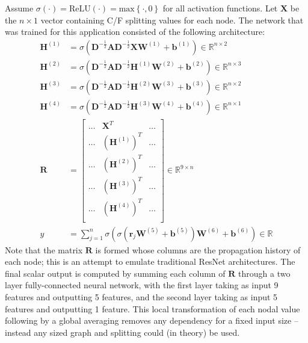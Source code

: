 \documentclass[review]{siamart190516}
\newcommand{\mat}[1]{\bm{{#1}}}
\renewcommand{\vec}[1]{\bm{{#1}}}
\begin{document}
Assume $\sigma\left(\cdot\right) = \text{ReLU}\left(\cdot\right) = \text{max}\left\{\cdot, 0\right\}$ for all activation functions.  Let $\mat{X}$ be the $n \times 1$ vector containing C/F splitting values for each node.  The network that was trained for this application consisted of the following architecture:
\begin{align*}
\mat{H}^{(1)} &= \sigma\left( \mat{D}^{-\frac{1}{2}} \mat{A} \mat{D}^{-\frac{1}{2}} \mat{X} \mat{W}^{(1)} + \vec{b}^{(1)} \right) \in \mathbb{R}^{n \times 2} \\
\mat{H}^{(2)} &= \sigma\left( \mat{D}^{-\frac{1}{2}} \mat{A} \mat{D}^{-\frac{1}{2}} \mat{H}^{(1)} \mat{W}^{(2)} + \vec{b}^{(2)}\right) \in \mathbb{R}^{n \times 3}\\
  \mat{H}^{(3)} &= \sigma\left( \mat{D}^{-\frac{1}{2}} \mat{A} \mat{D}^{-\frac{1}{2}} \mat{H}^{(2)} \mat{W}^{(3)} + \vec{b}^{(3)}\right) \in \mathbb{R}^{n \times 2}\\
  \mat{H}^{(4)} &= \sigma\left( \mat{D}^{-\frac{1}{2}} \mat{A} \mat{D}^{-\frac{1}{2}} \mat{H}^{(3)} \mat{W}^{(4)} + \vec{b}^{(4)}\right) \in \mathbb{R}^{n \times 1}\\
\mat{R} &=
\begin{bmatrix}
\hdots & \mat{X}^T & \hdots \\
\hdots & \left(\mat{H}^{(1)}\right)^T & \hdots \\
\hdots & \left(\mat{H}^{(2)}\right)^T & \hdots \\
\hdots & \left(\mat{H}^{(3)}\right)^T & \hdots \\
\hdots & \left(\mat{H}^{(4)}\right)^T & \hdots \\
\end{bmatrix} \in \mathbb{R}^{9 \times n}\\
y &= \sum_{j=1}^n \sigma\left( \sigma\left(\mat{r}_j\mat{W}^{(5)} + \vec{b}^{(5)}\right) \mat{W}^{(6)} + \vec{b}^{(6)}\right) \in \mathbb{R}
\end{align*}
Note that the matrix $\mat{R}$ is formed whose columns are the propagation history of each node; this is an attempt to emulate traditional ResNet architectures.  The final scalar output is computed by summing each column of $\mat{R}$ through a two layer fully-connected neural network, with the first layer taking as input 9 features and outputting 5 features, and the second layer taking as input 5 features and outputting 1 feature.  This local transformation of each nodal value following by a global averaging removes any dependency for a fixed input size -- instead any sized graph and splitting could (in theory) be used.
\end{document}
